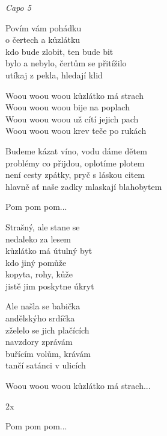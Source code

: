 
\vspace{-2pt}
\re{}
\textit{Capo 5}

\vspace{-2pt}
\ve{}
Povím vám pohádku\\
o čertech a kůzlátku\\
kdo bude zlobit, ten bude bit\\
bylo a nebylo, čertům se přitížilo\\
utíkaj z pekla, hledají klid 

\vspace{-2pt}
\re{*:}
Woou woou woou kůzlátko má strach\\
Woou woou woou bije na poplach\\
Woou woou woou už cítí jejich pach\\
Woou woou woou krev teče po rukách

\vspace{-2pt}
\cho{}
Budeme kázat víno, vodu dáme dětem\\
problémy co přijdou, oplotíme plotem \\
není cesty zpátky, pryč s láskou citem\\
hlavně ať naše zadky mlaskají blahobytem 

\vspace{-2pt}
\cho{}
Pom pom pom...

\vspace{-2pt}
\ve
Strašný, ale stane se\\
nedaleko za lesem\\
kůzlátko má útulný byt\\
kdo jiný pomůže\\
kopyta, rohy, kůže\\
jistě jim poskytne úkryt

\vspace{-2pt}
\ve{}
Ale našla se babička\\
andělskýho srdíčka\\
zželelo se jich plačících\\
navzdory zprávám\\
buřícím volům, krávám\\
tančí satánci v ulicích

\vspace{-3pt}
\re{*:}
Woou woou woou kůzlátko má strach...

\vspace{-3pt}
\cho{}
2x

\vspace{-2pt}
\cho{}
Pom pom pom...
\vspace{-4pt}

\esong